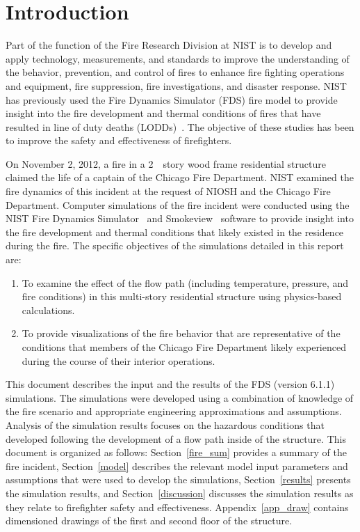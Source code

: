 \section{Introduction}
\label{intro}
Part of the function of the Fire Research Division at NIST is to develop and apply technology, measurements, and standards to improve the understanding of the behavior, prevention, and control of fires to enhance fire fighting operations and equipment, fire suppression, fire investigations, and disaster response. NIST has previously used the Fire Dynamics Simulator (FDS) fire model to provide insight into the fire development and thermal conditions of fires that have resulted in line of duty deaths (LODDs)~\cite{Madrzykowski:1,Iowa,Texas,Bryner:Charleston,barowy:texas}. The objective of these studies has been to improve the safety and effectiveness of firefighters.

On November 2, 2012, a fire in a 2~~story wood frame residential structure claimed the life of a captain of the Chicago Fire Department. NIST examined the fire dynamics of this incident at the request of NIOSH and the Chicago Fire Department. Computer simulations of the fire incident were conducted using the NIST Fire Dynamics Simulator~\cite{FDS_Users_Guide} and Smokeview~\cite{Smokeview_Users_Guide}  software to provide insight into the fire development and thermal conditions that likely existed in the residence during the fire. The specific objectives of the simulations detailed in this report are: 
\begin{enumerate}
\item To examine the effect of the flow path (including temperature, pressure, and fire conditions) in this multi-story residential structure using physics-based calculations.
\item To provide visualizations of the fire behavior that are representative of the conditions that members of the Chicago Fire Department likely experienced during the course of their interior operations.
\end{enumerate}
This document describes the input and the results of the FDS (version 6.1.1) simulations. The simulations were developed using a combination of knowledge of the fire scenario and appropriate engineering approximations and assumptions. Analysis of the simulation results focuses on the hazardous conditions that developed following the development of a flow path inside of the structure. This document is organized as follows: Section~\ref{fire_sum} provides a summary of the fire incident, Section~\ref{model} describes the relevant model input parameters and assumptions that were used to develop the simulations, Section~\ref{results} presents the simulation results, and Section~\ref{discussion} discusses the simulation results as they relate to firefighter safety and effectiveness. Appendix~\ref{app_draw} contains dimensioned drawings of the first and second floor of the structure.

